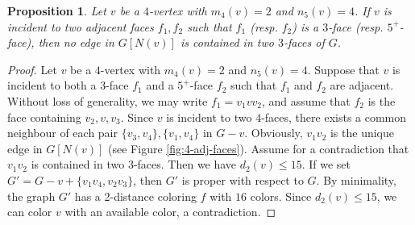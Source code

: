 \documentclass[12pt, reqno]{amsart}
\theoremstyle{plain}
\newtheorem{proposition}[equation]{Proposition}
\theoremstyle{definition}
\numberwithin{equation}{section}
\begin{document}
\begin{proposition}\label{prop:4-vertex-no-common-m1}
Let $v$ be a $4$-vertex with $m_4(v)=2$ and $n_5(v)=4$. If $v$ is incident to two adjacent faces $f_1,f_2$ such that $f_1$ (resp. $f_2$) is a $3$-face (resp. $5^+$-face), then no edge in $G[N(v)]$ is contained in two $3$-faces of $G$.
\end{proposition}
\begin{proof}
Let $v$ be a $4$-vertex with $m_4(v)=2$ and $n_5(v)=4$. Suppose that $v$ is incident to both a $3$-face $f_1$ and a $5^+$-face $f_2$ such that $f_1$ and $f_2$ are adjacent.
Without loss of generality, we may write $f_1=v_1vv_2$, and assume that $f_2$ is the face containing $v_2,v,v_3$. Since $v$ is incident to two $4$-faces, there exists a common neighbour of each pair  $\{v_3,v_4\}, \{v_1,v_4\}$  in $G-v$. 
Obviously, $v_1v_2$ is the unique edge in $G[N(v)]$ (see Figure \ref{fig:4-adj-faces}).  Assume for a contradiction that $v_1v_2$ is contained in two $3$-faces.  Then we have  $d_2(v)\leq 15$.  If we set  $G'=G-v+\{v_1v_4,v_2v_3\}$, then  $G'$ is proper with respect to $G$.  By minimality, the graph $G'$ has a 2-distance coloring $f$ with $16$ colors. Since $d_2(v)\leq 15$, we can color $v$ with an available color, a contradiction.
\end{proof}
\end{document}
